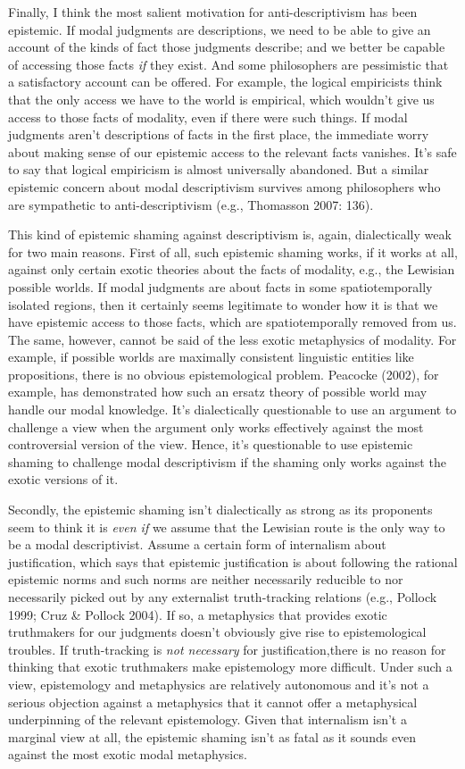 \documentclass[a4paper,12pt]{article}
\begin{document}
Finally, I think the most salient motivation for anti-descriptivism has been epistemic. If modal judgments are descriptions, we need to be able to give an account of the kinds of fact those judgments describe; and we better be capable of accessing those facts \emph{if} they exist. And some philosophers are pessimistic that a satisfactory account can be offered. For example, the logical empiricists think that the only access we have to the world is empirical, which wouldn't give us access to those facts of modality, even if there were such things. If modal judgments aren't descriptions of facts in the first place, the immediate worry about making sense of our epistemic access to the relevant facts vanishes. It's safe to say that logical empiricism is almost universally abandoned. But a similar epistemic concern about modal descriptivism survives among philosophers who are sympathetic to anti-descriptivism (e.g., Thomasson 2007: 136).

This kind of epistemic shaming against descriptivism is, again, dialectically weak for two main reasons. First of all, such epistemic shaming works, if it works at all, against only certain exotic theories about the facts of modality, e.g., the Lewisian possible worlds. If modal judgments are about facts in some spatiotemporally isolated regions, then it certainly seems legitimate to wonder how it is that we have epistemic access to those facts, which are spatiotemporally removed from us. The same, however, cannot be said of the less exotic metaphysics of modality. For example, if possible worlds are maximally consistent linguistic entities like propositions, there is no obvious epistemological problem. Peacocke (2002), for example, has demonstrated how such an ersatz theory of possible world may handle our modal knowledge. It's dialectically questionable to use an argument to challenge a view when the argument only works effectively against the most controversial version of the view. Hence, it's questionable to use epistemic shaming to challenge modal descriptivism if the shaming only works against the exotic versions of it.

Secondly, the epistemic shaming isn't dialectically as strong as its proponents seem to think it is \emph{even if} we assume that the Lewisian route is the only way to be a modal descriptivist. Assume a certain form of internalism about justification, which says that epistemic justification is about following the rational epistemic norms and such norms are neither necessarily reducible to nor necessarily picked out by any externalist truth-tracking relations (e.g., Pollock 1999; Cruz \& Pollock 2004). If so, a metaphysics that provides exotic truthmakers for our judgments doesn't obviously give rise to epistemological troubles. If truth-tracking is \emph{not necessary} for justification,\footnotemark there is no reason for thinking that exotic truthmakers make epistemology more difficult. Under such a view, epistemology and metaphysics are relatively autonomous and it's not a serious objection against a metaphysics that it cannot offer a metaphysical underpinning of the relevant epistemology. Given that internalism isn't a marginal view at all, the epistemic shaming isn't as fatal as it sounds even against the most exotic modal metaphysics.
\end{document}
